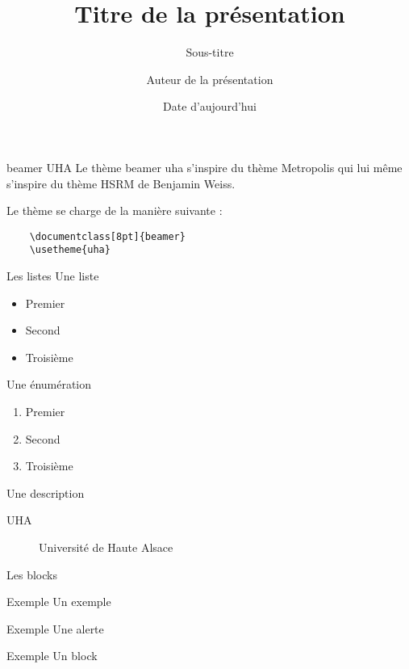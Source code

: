 \documentclass[8pt]{beamer}
\title{Titre de la présentation}
\subtitle{Sous-titre}
\date{Date d'aujourd'hui}
\author{Auteur de la présentation}
\institute{Université de Haute Alsace}
\begin{document}
\begin{frame}
	\titlepage
\end{frame}

\begin{frame}[fragile]{beamer UHA}
	Le thème beamer uha s'inspire du thème Metropolis qui lui même s'inspire du thème HSRM de Benjamin Weiss.

	Le thème se charge de la manière suivante :

	\begin{verbatim}
	\documentclass[8pt]{beamer}
	\usetheme{uha}
	\end{verbatim}
\end{frame}


\begin{frame}{Les listes}
	Une liste
	\begin{itemize}
		\item Premier
		\item Second
		\item Troisième
	\end{itemize}

	Une énumération
	\begin{enumerate}
		\item Premier
		\item Second
		\item Troisième
	\end{enumerate}

	Une description
	\begin{description}
		\item [UHA] Université de Haute Alsace
	\end{description}
\end{frame}

\begin{frame}{Les blocks}
	\begin{exampleblock}{Exemple}
		Un exemple
	\end{exampleblock}
	\begin{alertblock}{Exemple}
		Une alerte
	\end{alertblock}
	\begin{block}{Exemple}
		Un block
	\end{block}
\end{frame}
\end{document}
